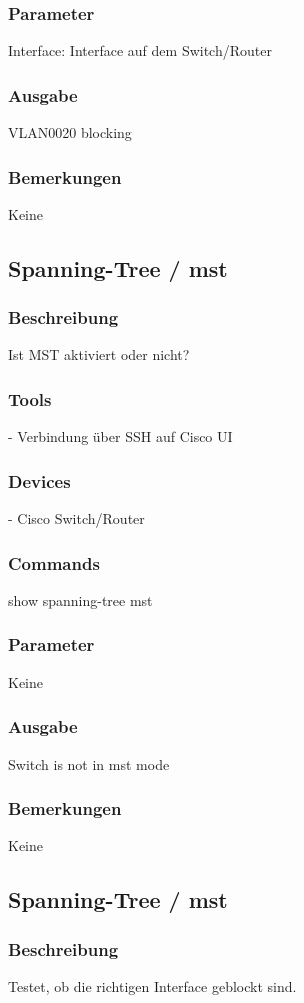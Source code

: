 \documentclass[a4,12pt]{scrartcl}
\begin{document}
\subsubsection{Parameter}
Interface: Interface auf dem Switch/Router
\subsubsection{Ausgabe}
VLAN0020            blocking
\subsubsection{Bemerkungen}
Keine

\subsection{Spanning-Tree / mst}
\subsubsection{Beschreibung}
Ist MST aktiviert oder nicht?
\subsubsection{Tools}
- Verbindung über SSH auf Cisco UI
\subsubsection{Devices}
- Cisco Switch/Router
\subsubsection{Commands}
show spanning-tree mst
\subsubsection{Parameter}
Keine
\subsubsection{Ausgabe}
Switch is not in mst mode
\subsubsection{Bemerkungen}
Keine



\subsection{Spanning-Tree / mst}
\subsubsection{Beschreibung}
Testet, ob die richtigen Interface geblockt sind.
\end{document}
